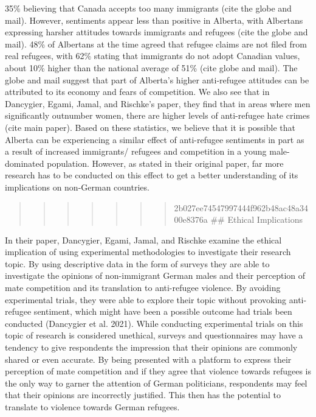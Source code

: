 \documentclass[
]{article}
\begin{document}
35\% believing that Canada accepts too many immigrants (cite the globe
and mail). However, sentiments appear less than positive in Alberta,
with Albertans expressing harsher attitudes towards immigrants and
refugees (cite the globe and mail). 48\% of Albertans at the time agreed
that refugee claims are not filed from real refugees, with 62\% stating
that immigrants do not adopt Canadian values, about 10\% higher than the
national average of 51\% (cite globe and mail). The globe and mail
suggest that part of Alberta's higher anti-refugee attitudes can be
attributed to its economy and fears of competition. We also see that in
Dancygier, Egami, Jamal, and Rischke's paper, they find that in areas
where men significantly outnumber women, there are higher levels of
anti-refugee hate crimes (cite main paper). Based on these statistics,
we believe that it is possible that Alberta can be experiencing a
similar effect of anti-refugee sentiments in part as a result of
increased immigrants/ refugees and competition in a young male-dominated
population. However, as stated in their original paper, far more
research has to be conducted on this effect to get a better
understanding of its implications on non-German countries.

\begin{quote}
\begin{quote}
\begin{quote}
\begin{quote}
\begin{quote}
\begin{quote}
\begin{quote}
2b027ee74547997444f962b48ac48a3400e8376a \#\# Ethical Implications
\end{quote}
\end{quote}
\end{quote}
\end{quote}
\end{quote}
\end{quote}
\end{quote}

In their paper, Dancygier, Egami, Jamal, and Rischke examine the ethical
implication of using experimental methodologies to investigate their
research topic. By using descriptive data in the form of surveys they
are able to investigate the opinions of non-immigrant German males and
their perception of mate competition and its translation to anti-refugee
violence. By avoiding experimental trials, they were able to explore
their topic without provoking anti-refugee sentiment, which might have
been a possible outcome had trials been conducted (Dancygier et al.
2021). While conducting experimental trials on this topic of research is
considered unethical, surveys and questionnaires may have a tendency to
give respondents the impression that their opinions are commonly shared
or even accurate. By being presented with a platform to express their
perception of mate competition and if they agree that violence towards
refugees is the only way to garner the attention of German politicians,
respondents may feel that their opinions are incorrectly justified. This
then has the potential to translate to violence towards German refugees.
\end{document}
